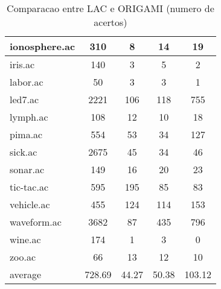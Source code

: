 \begin{table}[htbp]
\begin{tabular}{|l|c|c|c|c|}
		\hline
		ionosphere.ac   & 310           & 8                  & 14                       & 19                            \\
		\hline
		iris.ac         & 140           & 3                  & 5                        & 2                             \\
		\hline
		labor.ac        & 50            & 3                  & 3                        & 1                             \\
		\hline
		led7.ac         & 2221          & 106                & 118                      & 755                           \\
		\hline
		lymph.ac        & 108           & 12                 & 10                       & 18                            \\
		\hline
		pima.ac         & 554           & 53                 & 34                       & 127                           \\
		\hline
		sick.ac         & 2675          & 45                 & 34                       & 46                            \\
		\hline
		sonar.ac        & 149           & 16                 & 20                       & 23                            \\
		\hline
		tic-tac.ac      & 595           & 195                & 85                       & 83                            \\
		\hline
		vehicle.ac      & 455           & 124                & 114                      & 153                           \\
		\hline
		waveform.ac     & 3682          & 87                 & 435                      & 796                           \\
		\hline
		wine.ac         & 174           & 1                  & 3                        & 0                             \\
		\hline
		zoo.ac          & 66            & 13                 & 12                       & 10                            \\
		\hline
		average         & 728.69        & 44.27              & 50.38                    & 103.12                        \\
		\hline
		\end{tabular}
	\caption{Comparacao entre LAC e ORIGAMI (numero de acertos)}
	\label{tab:comparison_lac_origami_uc}
\end{table}